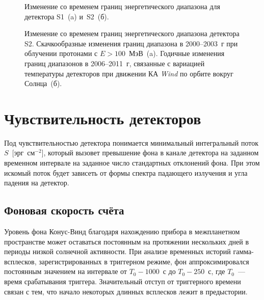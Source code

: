 \begin{figure}[h]
  \begin{minipage}[h]{0.5\textwidth}
  \end{minipage}
  \hfill
  \begin{minipage}[h]{0.5\textwidth}
  \end{minipage}
  \caption[Изменение со временем границ энергетического диапазона для детектора S1 и~S2.]
  {Изменение со временем границ энергетического диапазона для детектора S1~(a) и~S2~(б).}
  \label{img:KW_E_boundaries}  
\end{figure}

\begin{figure}[h]
  \begin{minipage}[h]{0.5\textwidth}
  \end{minipage}
  \hfill
  \begin{minipage}[h]{0.5\textwidth}
  \end{minipage}
  \caption[Изменение со временем границ энергетического диапазона детектора S2 
  в 2000--2003~г и 2006--2011~г.]
  {Изменение со временем границ энергетического диапазона детектора S2. 
  Скачкообразные изменения границ диапазона в 2000--2003~г при облучении протонами с $E>100$~МэВ~(a). 
  Годичные изменения границ диапазонов в 2006--2011~г, связанные с вариацией температуры детекторов 
  при движении КА \textit{Wind} по орбите вокруг Солнца~(б).}
  \label{img:KW_E_boundaries_features}  
\end{figure}

\section{Чувствительность детекторов}
Под чувствительностью детектора понимается минимальный интегральный поток $S$~[эрг~см$^{-2}$], 
который вызовет превышение фона в канале детектора на заданном временном интервале 
на заданное число стандартных отклонений фона. При этом искомый поток будет зависеть 
от формы спектра падающего излучения и угла падения на детектор.

\subsection{Фоновая скорость счёта}\label{sec:Bg_rate}
Уровень фона Конус-Винд благодаря нахождению прибора в межпланетном пространстве 
может оставаться постоянным на протяжении нескольких дней в периоды низкой 
солнечной активности. При анализе временных историй гамма-всплесков, 
зарегистрированных в триггерном режиме, фон аппроксимировался 
постоянным значением на интервале от $T_0 - 1000$~с до $T_0 - 250$~с, 
где $T_0$~--- время срабатывания триггера. Значительный отступ от триггерного 
времени связан с тем, что начало некоторых длинных всплесков лежит в предыстории. 

